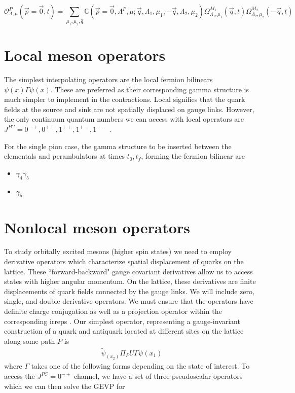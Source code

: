 \begin{equation}
    \mathcal{O}_{\Lambda,\mu}^P(\vec{p}=\vec{0},t) = \sum_{\mu_1,\mu_2,\hat{q}} \mathbb{C}(\vec{p} = \vec{0},\Lambda^P,\mu;\vec{q},\Lambda_1,\mu_1;-\vec{q},\Lambda_2,\mu_2) \Omega^{M_1}_{\Lambda_1,\mu_1}(\vec{q},t) \Omega^{M_2}_{\Lambda_2,\mu_2}(-\vec{q},t)
\end{equation}

\section{Local meson operators}

The simplest interpolating operators are the local fermion bilinears $\bar{\psi}(x)\Gamma\psi(x)$. These are preferred as their corresponding gamma structure is much simpler to implement in the contractions. Local signifies that the quark fields at the source and sink are not spatially displaced on gauge links. However, the only continuum quantum numbers we can access with local operators are $J^{PC} = 0^{-+},0^{++},1^{++},1^{+-},1^{--}$ \cite{Dudek_2008}.

For the single pion case, the gamma structure to be inserted between the elementals and perambulators at times $t_0,t_f$, forming the fermion bilinear are
\begin{itemize}
    \item $\gamma_4\gamma_5$
    \item $\gamma_5$

\end{itemize}

\section{Nonlocal meson operators}
To study orbitally excited mesons (higher spin states) we need to employ derivative operators which characterize spatial displacement of quarks on the lattice. These ``forward-backward" gauge covariant derivatives allow us to access states with higher angular momentum. On the lattice, these derivatives are finite displacements of quark fields connected by the gauge links. We will include zero, single, and double derivative operators. We must ensure that the operators have definite charge conjugation as well as a projection operator within the corresponding irreps \cite{liao2002excitedcharmoniumspectrumanisotropic}. Our simplest operator, representing a gauge-invariant construction of a quark and antiquark located at different sites on the lattice along some path $P$ is 
\begin{align}
    \tilde{\psi}_(x_2)\Pi_P U \Gamma \psi(x_1)
\end{align}
where $\Gamma$ takes one of the following forms depending on the state of interest. To access the $J^{PC}=0^{-+}$ channel, we have a set of three pseudoscalar operators which we can then solve the GEVP for

